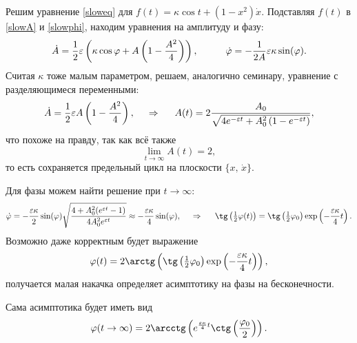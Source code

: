 Решим уравнение \eqref{sloweq} для $f(t) = \kappa \cos t + (1-x^2) \dot{x}$. Подставляя $f(t)$ в \eqref{slowA} и \eqref{slowphi}, находим
уравнения на амплитуду и фазу:
\begin{equation*}
    \dot{A} = \frac{1}{2} \varepsilon \left(\kappa \cos \varphi + A \left(1-\frac{A^2}{4}\right) \right),
    \hspace{10 mm} 
    \dot{\varphi} = - \frac{1}{2A} \varepsilon \kappa \sin(\varphi).
\end{equation*}
Считая $\kappa$ тоже малым параметром, решаем, аналогично семинару, уравнение с разделяющимеся переменными:
\begin{equation*}
    \dot{A} = \frac{1}{2}\varepsilon A \left(1 - \frac{A^2}{4}\right),
    \hspace{0.5cm} \Rightarrow \hspace{0.5cm} 
    A(t) = 2 \frac{A_0}{\sqrt{ 4 e^{-\varepsilon t} + A_0^2\left(1 -  e^{-\varepsilon t}\right)}},
\end{equation*}
что похоже на правду, так как всё также
\begin{equation*}
    \lim_{t\to \infty} A(t) = 2,
\end{equation*}
то есть сохраняется предельный цикл на плоскости $\{x,\, \dot{x}\}$. 

Для фазы можем найти решение при $t\to \infty$:
\begin{equation*}
    \dot{\varphi} = -\frac{\varepsilon \kappa}{2} \sin(\varphi) \sqrt{\frac{4 + A_0^2 (e^{\varepsilon t} - 1)}{4 A_0^2 e^{\varepsilon t}}} \approx  - \frac{\varepsilon \kappa}{4} \sin(\varphi),
    \hspace{0.5cm} \Rightarrow \hspace{0.5cm}
    \tg\left(\tfrac{1}{2}\varphi(t)\right) = \tg\left(\tfrac{1}{2}\varphi_0\right)\exp\left(- \frac{\varepsilon \kappa}{4} t\right).
\end{equation*}
Возможно даже корректным будет выражение
\begin{equation*}
    \varphi(t) = 2 \arctg\left(\tg\left(\tfrac{1}{2}\varphi_0\right) \exp\left(- \frac{\varepsilon \kappa}{4} t\right)\right),
\end{equation*}
получается малая накачка определяет асимптотику на фазы на бесконечности.

Сама асимптотика будет иметь вид
\begin{equation*}
    \varphi(t \to \infty) = 2 \arcctg \left(e^{\frac{\varepsilon \kappa}{4} t} \ctg \left(\frac{\varphi_0}{2}\right)\right).
\end{equation*}




